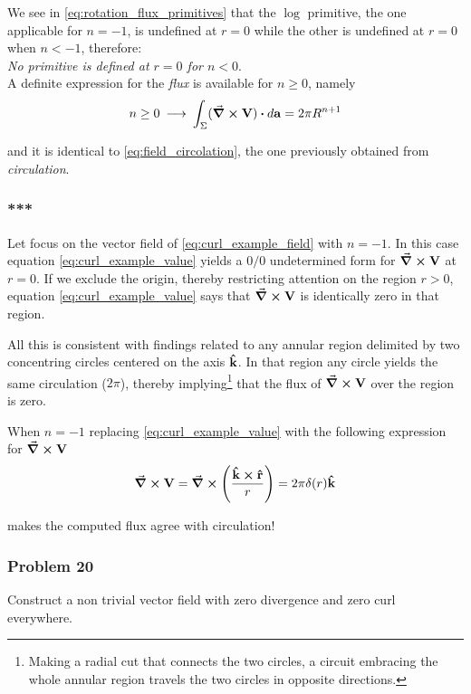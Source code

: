 We see in \ref{eq:rotation_flux_primitives} that the $\log$  primitive, the one applicable for $n = -1$, is  undefined at $r=0$ while the other is undefined at $r=0$ when $n < -1$, therefore:\\

\textit{No primitive is defined at $r=0$ for $n < 0$}. \\ 

A definite expression for the \textit{flux} is available for $n \geq 0$, namely 
\begin{equation}
n \geq 0 \: \longrightarrow \: \int_{\Sigma} (\curl{\vb{V}}) \vdot d\vb{a} = 2\pi R^{n+1} 
\label{eq:flux}
\end{equation}

and it is identical to \ref{eq:field_circolation}, the one previously obtained from \textit{circulation}. 

\subsubsection*{***}
Let focus on the vector field of \ref{eq:curl_example_field} with $n = -1$. In this case equation \ref{eq:curl_example_value} yields a $0/0$ undetermined form for $\curl{\vb{V}}$ at $r=0$. If we exclude the origin, thereby restricting attention on the region $r > 0$, equation \ref{eq:curl_example_value} says that $\curl{\vb{V}}$ is identically zero in that region. 

All this is consistent with findings related to any annular region delimited by two concentring circles centered on the axis $\vu{k}$. In that region any circle yields the same circulation ($2\pi$), thereby implying\footnote{Making a radial cut that connects the two circles, a circuit embracing the whole annular region travels the two circles in opposite directions.} that the flux of $\curl{\vb{V}}$ over the region is zero.

When $n = -1$ replacing \ref{eq:curl_example_value} with the following expression for $\curl{\vb{V}}$ 
\begin{equation}
\curl{\vb{V}} = \curl{ \left( \frac{\vu{k} \cross \vu{r}}{r} \right) } = 2\pi \delta(r) \vu{k}
\label{eq:flux}
\end{equation}

makes the computed flux agree with circulation! 

\subsubsection*{Problem 20}
Construct a non trivial vector field with zero divergence and zero curl everywhere.

